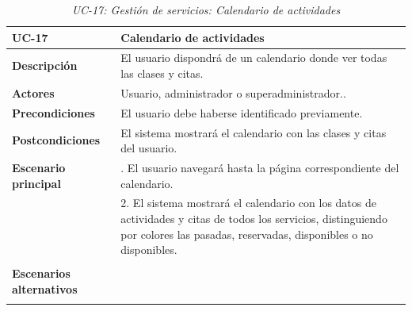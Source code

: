 \begin{table}
  \begin{center}
    \begin{tabularx}{16.4cm}{|l|X|}
      \hline
      \textbf{UC-17} & \textbf{Calendario de actividades}\\
      \hline
      \textbf{Descripción} & El usuario dispondrá de un calendario donde ver todas las clases y citas. \\
      \hline
      \textbf{Actores} & Usuario, administrador o superadministrador..\\
      \hline
      \textbf{Precondiciones} & El usuario debe haberse identificado previamente.\\
      \hline
      \textbf{Postcondiciones} & El sistema mostrará el calendario con las clases y citas del usuario.\\
      \hline
      \textbf{Escenario principal} & \smallskip 1. El usuario navegará hasta la página correspondiente del calendario.\\
      & 2. El sistema mostrará el calendario con los datos de actividades y citas de todos los servicios, distinguiendo por colores las pasadas, reservadas, disponibles o no disponibles.\\
      & \\
      \hline
      \textbf{Escenarios alternativos} & \\
      & \\
      \hline
    \end{tabularx}
    \caption{\textit{UC-17: Gestión de servicios: Calendario de actividades}}
    \label{tab:CU-calendario}
  \end{center}
\end{table}


